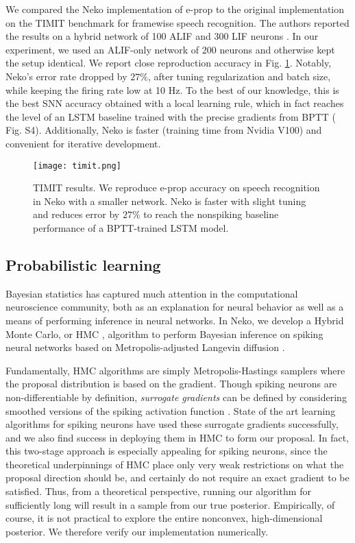 \documentclass[sigconf,dvipsnames]{acmart}
\begin{document}
We compared the Neko implementation of e-prop to the original implementation on the TIMIT benchmark \cite{garofolo1992timit} for framewise speech recognition.
The authors reported the results on a hybrid network of 100 ALIF and 300 LIF neurons \cite{bellec2020solution}.
In our experiment, we used an ALIF-only network of 200 neurons and otherwise kept the setup identical.
We report close reproduction accuracy in Fig. \ref{fig:timit}.
Notably, Neko's error rate dropped by $27\%$, after tuning regularization and batch size, while keeping the firing rate low at 10 Hz.
To the best of our knowledge, this is the best SNN accuracy obtained with a local learning rule, which in fact reaches the level of an LSTM baseline trained with the precise gradients from BPTT (\cite{bellec2020solution} Fig. S4).
Additionally, Neko is faster (training time from Nvidia V100) and convenient for iterative development.


\begin{figure}
    \centering
    \texttt{[image: timit.png]}
    \caption{TIMIT results.
      \textmd{We reproduce e-prop accuracy on speech recognition in Neko with a smaller network. Neko is faster with slight tuning and reduces error by $27\%$ to reach the nonspiking baseline performance of a BPTT-trained LSTM model.}
    }
    \label{fig:timit}
\end{figure}


\subsection{Probabilistic learning}
Bayesian statistics has captured much attention in the computational neuroscience community, both as an explanation for neural behavior \cite{Knill2004} as well as a means of performing inference in neural networks. In Neko, we develop a Hybrid Monte Carlo, or HMC \citep{Neil2011HMC}, algorithm to perform Bayesian inference on spiking neural networks based on Metropolis-adjusted Langevin diffusion \cite{Rossky1978}.

Fundamentally, HMC algorithms are simply Metropolis-Hastings samplers \cite{Hoff2009Bayes} where the proposal distribution is based on the gradient. Though spiking neurons are non-differentiable by definition, \textit{surrogate gradients} can be defined by considering smoothed versions of the spiking activation function \cite{neftci2019surrogate}. State of the art learning algorithms for spiking neurons have used these surrogate gradients successfully, and we also find success in deploying them in HMC to form our proposal. In fact, this two-stage approach is especially appealing for spiking neurons, since the theoretical underpinnings of HMC place only very weak restrictions on what the proposal direction should be, and certainly do not require an exact gradient to be satisfied. Thus, from a theoretical perspective, running our algorithm for sufficiently long will result in a sample from our true posterior. Empirically, of course, it is not practical to explore the entire nonconvex, high-dimensional posterior. We therefore verify our implementation numerically.
\end{document}
